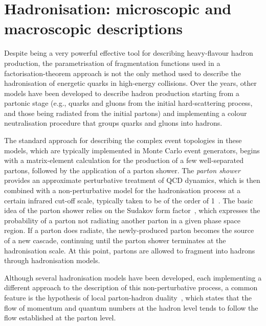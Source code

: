 \section{Hadronisation: microscopic and macroscopic descriptions}\label{sec:hadronisation}
Despite being a very powerful effective tool for describing heavy-flavour hadron production, the parametrisation of fragmentation functions used in a factorisation-theorem approach is not the only method used to describe the hadronisation of energetic quarks in high-energy collisions. Over the years, other models have been developed to describe hadron production starting from a partonic stage (e.g., quarks and gluons from the initial hard-scattering process, and those being radiated from the initial partons) and implementing a colour neutralisation procedure that groups quarks and gluons into hadrons.

The standard approach for describing the complex event topologies in these models, which are typically implemented in Monte Carlo event generators, begins with a matrix-element calculation for the production of a few well-separated partons, followed by the application of a parton shower. The \emph{parton shower} provides an approximate perturbative treatment of QCD dynamics, which is then combined with a non-perturbative model for the hadronisation process at a certain infrared cut-off scale, typically taken to be of the order of 1~\gev. The basic idea of the parton shower relies on the Sudakov form factor~\cite{Sudakov:1954sw}, which expresses the probability of a parton not radiating another parton in a given phase space region. If a parton does radiate, the newly-produced parton becomes the source of a new cascade, continuing until the parton shower terminates at the hadronisation scale. At this point, partons are allowed to fragment into hadrons through hadronisation models. 

Although several hadronisation models have been developed, each implementing a different approach to the description of this non-perturbative process, a common feature is the hypothesis of local parton-hadron duality~\cite{Azimov:1984np}, which states that the flow of momentum and quantum numbers at the hadron level tends to follow the flow established at the parton level.


